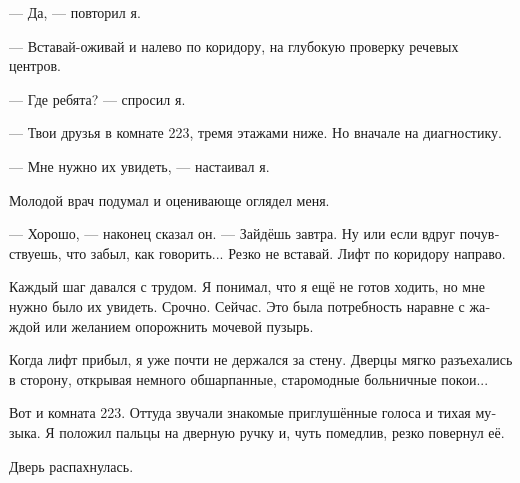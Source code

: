 \documentclass[a4paper,10pt,fleqn]{book}\usepackage{polyglossia}\setdefaultlanguage[babelshorthands=true]{russian}\setotherlanguage{english}\defaultfontfeatures{Ligatures=TeX,Mapping=tex-text}
\begin{document}
--- Да, --- повторил я.

--- Вставай-оживай и налево по коридору, на глубокую проверку речевых центров.

--- Где ребята? --- спросил я.

--- Твои друзья в комнате 223, тремя этажами ниже.
Но вначале на диагностику.

--- Мне нужно их увидеть, --- настаивал я.

Молодой врач подумал и оценивающе оглядел меня.

--- Хорошо, --- наконец сказал он.
--- Зайдёшь завтра.
Ну или если вдруг почувствуешь, что забыл, как говорить...
Резко не вставай.
Лифт по коридору направо.

Каждый шаг давался с трудом.
Я понимал, что я ещё не готов ходить, но мне нужно было их увидеть.
Срочно.
Сейчас.
Это была потребность наравне с жаждой или желанием опорожнить мочевой пузырь.

Когда лифт прибыл, я уже почти не держался за стену.
Дверцы мягко разъехались в сторону, открывая немного обшарпанные, старомодные больничные покои...

Вот и комната 223.
Оттуда звучали знакомые приглушённые голоса и тихая музыка.
Я положил пальцы на дверную ручку и, чуть помедлив, резко повернул её.

Дверь распахнулась.
\end{document}
